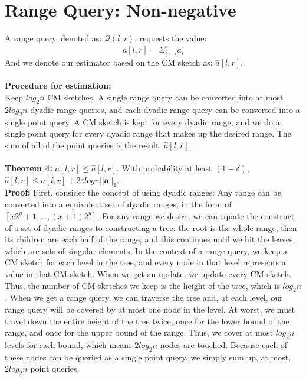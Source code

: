 \documentclass[11pt]{article}
\begin{document}
{\section{Range Query: Non-negative}
A range query, denoted as: $\mathcal{Q}(l,r)$, requests the value:
\begin{align*}
    a[l,r] = \Sigma_{i=l}^r a_i
\end{align*}
And we denote our estimator based on the CM sketch as: $\hat a[l,r]$.\\\\
    \textbf{Procedure for estimation:}\\
    Keep $log_2n$ CM sketches. A single range query can be converted into at most $2log_2n$ dyadic range queries, and each dyadic range query can be converted into a single point query. A CM sketch is kept for every dyadic range, and we do a single point query for every dyadic range that makes up the desired range. The sum of all of the point queries is the result, $\hat a[l,r]$.\\\\
    \textbf{Theorem 4: } $a[l,r] \leq \hat a[l,r]$. With probability at least $(1-\delta)$, $\hat a[l,r] \leq a[l,r] + 2\varepsilon logn ||\bm{a}||_1$.\\ 
    \textbf{Proof:} First, consider the concept of using dyadic ranges: Any range can be converted into a equivalent set of dyadic ranges, in the form of $[x2^y+1, ... , (x+1)2^y]$. For any range we desire, we can equate the construct of a set of dyadic ranges to constructing a tree: the root is the whole range, then its children are each half of the range, and this continues until we hit the leaves, which are sets of singular elements. In the context of a range query, we keep a CM sketch for each level in the tree, and every node in that level represents a value in that CM sketch. When we get an update, we update every CM sketch. Thus, the number of CM sketches we keep is the height of the tree, which is $log_2n$. When we get a range query, we can traverse the tree and, at each level, our range query will be covered by at most one node in the level. At worst, we must travel down the entire height of the tree twice, once for the lower bound of the range, and once for the upper bound of the range. Thus, we cover at most $log_2n$ levels for each bound, which means $2log_2n$ nodes are touched. Because each of these nodes can be queried as a single point query, we simply sum up, at most, $2log_2n$ point queries. \\\\
}
\end{document}
